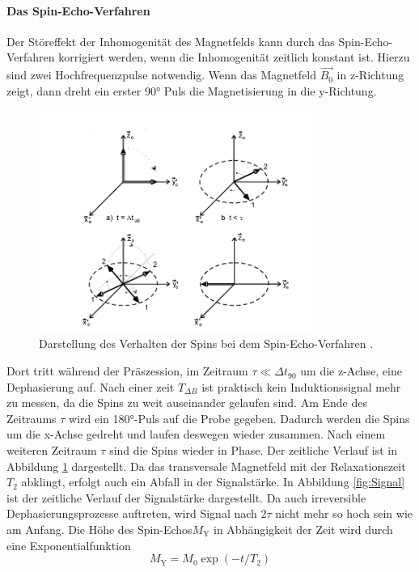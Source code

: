 \paragraph{Das Spin-Echo-Verfahren}
Der Störeffekt der Inhomogenität des Magnetfelds kann durch das Spin-Echo-Verfahren
korrigiert werden, wenn die Inhomogenität zeitlich konstant ist. Hierzu sind zwei Hochfrequenzpulse
notwendig. Wenn das Magnetfeld $\vec{B_0}$ in z-Richtung zeigt, dann dreht ein
erster 90° Puls die Magnetisierung in die y-Richtung.
\begin{figure}[H]
  \centering
  \includegraphics[width=0.8\textwidth]{pics/SEM.png}
  \caption{Darstellung des Verhalten der Spins bei dem Spin-Echo-Verfahren \cite{Anleitung}.}
  \label{fig:SEM}
\end{figure}
Dort tritt während der
Präszession, im Zeitraum $ \tau \ll \Delta t_{90}$ um die z-Achse, eine Dephasierung auf.
Nach einer zeit $T_{\Delta B}$ ist praktisch kein Induktionssignal mehr zu messen, da
die Spins zu weit auseinander gelaufen sind. Am Ende des Zeitraums $\tau$ wird
ein 180°-Puls auf die Probe gegeben. Dadurch werden die Spins um die x-Achse gedreht und
laufen deswegen wieder zusammen. Nach einem weiteren Zeitraum $\tau$ sind die
Spins wieder in Phase. Der zeitliche Verlauf ist in Abbildung \ref{fig:SEM} dargestellt.
Da das transversale Magnetfeld mit der Relaxationszeit $T_2$ abklingt, erfolgt auch ein
Abfall in der Signalstärke. In Abbildung \ref{fig:Signal} ist der zeitliche Verlauf der
Signalstärke dargestellt. Da auch irreversible Dephasierungsprozesse auftreten, wird
Signal nach $2\tau$ nicht mehr so hoch sein wie am Anfang. Die
Höhe des Spin-Echos$M_{\text{Y}}$ in Abhängigkeit der Zeit wird durch eine
Exponentialfunktion
\begin{equation}
  M_{\text{Y}}=M_0 \exp{(-t/T_2)}
\label{eq:MYT2}
\end{equation}
